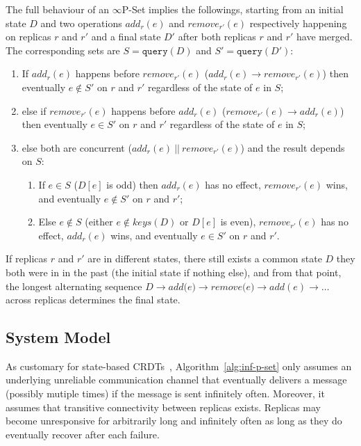 \documentclass[11pt, oneside]{article}   	%
\begin{document}
The full behaviour of an $\infty$P-Set implies the followings, starting from an initial state $D$ and two operations $\textit{add}_r(e)$ and $\textit{remove}_{r'}(e)$ respectively happening on replicas $r$ and $r'$ and a final state $D'$ after both replicas $r$ and $r'$ have merged. The corresponding sets are $S=\texttt{query}(D)$ and $S'=\texttt{query}(D')$:
\begin{enumerate}
	\item If $\textit{add}_r(e)$ happens before $\textit{remove}_{r'}(e)$ ($\textit{add}_r(e)\rightarrow \textit{remove}_{r'}(e)$) then eventually $e \notin S'$ on $r$ and $r'$ regardless of the state of $e$ in $S$;
	\item else if $\textit{remove}_{r'}(e)$ happens before $\textit{add}_{r}(e)$ ($\textit{remove}_{r'}(e) \rightarrow  \textit{add}_r(e)$) then eventually $e \in S'$ on $r$ and $r'$ regardless of the state of $e$ in $S$;
	\item else both are concurrent ($add_r(e) ~||~ remove_{r'}(e)$) and the result depends on $S$:
	    \begin{enumerate}
		\item	 If $e \in S$ ($D[e]$ is odd) then $add_r(e)$ has no effect, $remove_{r'}(e)$ wins, and eventually $e \notin S'$ on $r$ and $r'$;
		\item Else $e \notin S$ (either $e \notin \textit{keys}(D)$ or $D[e]$ is even), $remove_{r'}(e)$  has no effect, $add_r(e)$ wins, and eventually $e \in S'$ on $r$ and $r'$.
	    \end{enumerate}
\end{enumerate}

If replicas $r$ and $r'$ are in different states, there still exists a common state $D$ they both were in in the past (the initial state if nothing else), and from that point, the longest alternating sequence $D \rightarrow \textit{add(e)} \rightarrow \textit{remove(e)}\rightarrow \textit{add}(e) \rightarrow \dots$ across replicas determines the final state.

\subsection{System Model}
\label{sec:system-model}

As customary for state-based CRDTs~\cite{shapiro:inria-00555588}, Algorithm~\ref{alg:inf-p-set} only assumes an underlying unreliable communication channel that eventually delivers  a message (possibly mutiple times) if the message is sent infinitely often. Moreover,  it assumes that transitive connectivity between replicas exists. Replicas may become unresponsive for arbitrarily long and infinitely often as long as they do eventually recover after each failure.
\end{document}

